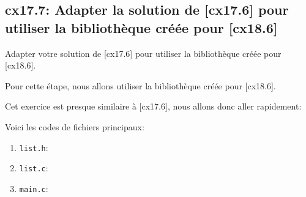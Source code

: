 \documentclass[a4paper,11pt]{article}
\begin{document}
      \newpage
      \subsection{cx17.7: Adapter la solution de [cx17.6] pour utiliser la bibliothèque créée pour [cx18.6]}
        \noindent Adapter votre solution de [cx17.6] pour utiliser la bibliothèque créée pour [cx18.6].

        \bigskip
        \noindent Pour cette étape, nous allons utiliser la bibliothèque créée pour [cx18.6].

        \bigskip
        \noindent Cet exercice est presque similaire à [cx17.6], nous allons donc aller rapidement:

        \bigskip
        \noindent Voici les codes de fichiers principaux:

        \begin{enumerate}
          \item \texttt{list.h}:
            
          \item \texttt{list.c}:
            
          \item \texttt{main.c}:
            
        \end{enumerate}
\end{document}
